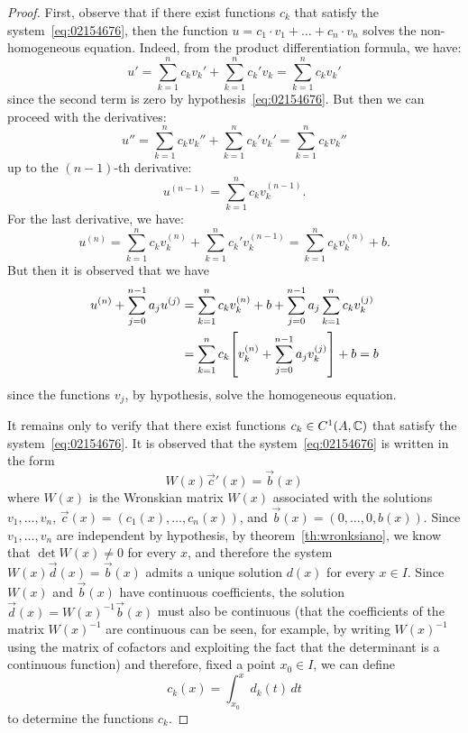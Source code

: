 \begin{proof}
First, observe that if there exist functions $c_k$ that
satisfy the system~\eqref{eq:02154676}, then the function $u = c_1
\cdot v_1 + \dots + c_n \cdot v_n$ solves the non-homogeneous
equation. Indeed, from the product differentiation formula, we have:
\[
  u' = \sum_{k=1}^n c_k v_k' + \sum_{k=1}^n c_k' v_k
     = \sum_{k=1}^n c_k v_k'
\]
since the second term is zero by hypothesis~\eqref{eq:02154676}.
But then we can proceed with the derivatives:
\[
  u'' = \sum_{k=1}^n c_k v_k'' + \sum_{k=1}^n c_k' v_k'
      = \sum_{k=1}^n c_k v_k''
\]
up to the $(n-1)$-th derivative:
\[
  u^{(n-1)} = \sum_{k=1}^n c_k v_k^{(n-1)}.
\]
For the last derivative, we have:
\[
  u^{(n)} = \sum_{k=1}^n c_k v_k^{(n)} + \sum_{k=1}^n c_k' v_k^{(n-1)}
          = \sum_{k=1}^n c_k v_k^{(n)} + b.
\]
But then it is observed that we have
\begin{align*}
 u^{(n)} + \sum_{j=0}^{n-1} a_j u^{(j)}
  &= \sum_{k=1}^n c_k v_k^{(n)} + b + \sum_{j=0}^{n-1} a_j \sum_{k=1}^n c_k
 v_k^{(j)} \\
  &= \sum_{k=1}^n c_k {\left[ v_k^{(n)} + \sum_{j=0}^{n-1} a_j v_k^{(j)} \right]} + b =
 b
\end{align*}
 since the functions $v_j$, by hypothesis, solve the homogeneous equation.

 It remains only to verify that there exist functions $c_k\in
 C^1(A,{\mathbb C})$ that satisfy the system~\eqref{eq:02154676}.
 It is observed that the system~\eqref{eq:02154676} is written in the form
 \[
   W(x) \vec c'(x) = \vec b(x)
 \]
 where $W(x)$ is the Wronskian matrix $W(x)$ associated
 with the solutions $v_1, \dots, v_n$, $\vec c(x) = (c_1(x), \dots,
 c_n(x))$, and $\vec b(x) = (0, \dots, 0, b(x))$.
 Since $v_1, \dots, v_n$ are independent by hypothesis,
 by theorem~\ref{th:wronksiano},
 we know that
 $\det W(x)\neq 0$ for every $x$, and therefore the system $W(x) \vec d(x) =
 \vec b(x)$
 admits a unique solution $d(x)$ for every $x\in I$.
 Since $W(x)$ and $\vec b(x)$ have continuous coefficients,
  the solution $\vec d(x) = W(x)^{-1} \vec b(x)$ must also be continuous (that
 the coefficients of the matrix $W(x)^{-1}$ are continuous can be seen, for
 example, by writing $W(x)^{-1}$ using the matrix of cofactors and exploiting
 the fact that the determinant is a continuous function)
 and therefore, fixed a point $x_0\in I$,
 we can define
 \[
   c_k(x) = \int_{x_0}^x d_k(t)\, dt
 \]
 to determine the functions $c_k$.
\end{proof}

